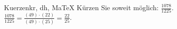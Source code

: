 \begin{MAufgabe}{Kuerzen}{kr, dh, MaTeX}
K\"urzen Sie soweit m\"oglich: $\frac{1078}{1225}$.\\ 
\ifLsg\MLoesung
\quad $\frac{1078}{1225}=\frac{(49)\cdot(22)}{(49)\cdot(25)}=\frac{22}{25}$.\else\relax\fi
 \end{MAufgabe}
